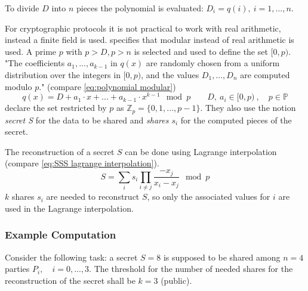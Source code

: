		To divide $D$ into $n$ pieces the polynomial is evaluated: $D_i=q(i),\ i=1,...,n$.
		
		For cryptographic protocols it is not practical to work with real arithmetic, instead a finite field is used. \textcite{Shamir1979} specifies that modular instead of real arithmetic is used. A prime $p$ with $p>D, p>n$ is selected and used to define the set $[0, p)$. "The coefficients $a_1, ..., a_{k-1}$ in $q(x)$ are randomly chosen	from a uniform distribution over the integers in $[0, p)$, and the values $D_1, ..., D_n$ are computed modulo $p$." \autocite[p. 613]{Shamir1979} (compare \ref{eq:polynomial modular})
		\begin{equation}
		\label{eq:polynomial modular}
		q(x) = D + a_1 \cdot x + ... + a_{k-1} \cdot x^{k-1} \mod p \qquad D,\ a_i \in [0,p)\ , \quad p \in \mathbb{P}
		\end{equation}
		\textcite[p. 7]{Cramer2015} declare the set restricted by $p$ as $\mathbb{Z}_p = \{0, 1, ..., p-1\}$. They also use the notion \textit{secret S} for the data to be shared and \textit{shares $s_i$} for the computed pieces of the secret.
		
		
		
		
		
		The reconstruction of a secret $S$ can be done using Lagrange interpolation (compare \ref{eq:SSS lagrange interpolation}).
		\begin{equation}
		\label{eq:SSS lagrange interpolation}
		S = \sum_i s_i \prod_{i \neq j} \frac{-x_j}{x_i-x_j} \mod p
		\end{equation}
		 $k$ shares $s_i$ are needed to reconstruct $S$, so only the associated values for $i$ are used in the Lagrange interpolation.
						
		\subsubsection{Example Computation}
		\label{Example Computation}
		
		Consider the following task: a secret $S=8$ is supposed to be shared among $n=4$ parties $P_i,\quad i=0,...,3$. The threshold for the number of needed shares for the reconstruction of the secret shall be $k=3$ (public).
		
